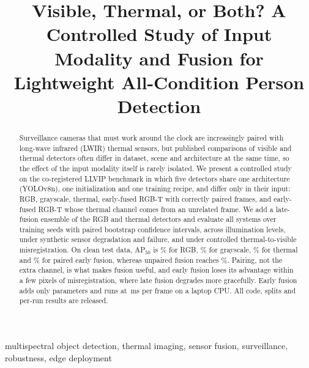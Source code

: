 \documentclass[conference]{IEEEtran}
\newif\ifpending \pendingtrue
\newcommand{\pending}[1]{\ifpending{\color{orange!85!black}#1}\else#1\fi}
\begin{document}
\title{Visible, Thermal, or Both? A Controlled Study of Input Modality and Fusion for Lightweight All-Condition Person Detection}

\author{
}

\maketitle

\begin{abstract}
Surveillance cameras that must work around the clock are increasingly paired with long-wave infrared (LWIR) thermal sensors, but published comparisons of visible and thermal detectors often differ in dataset, scene and architecture at the same time, so the effect of the input modality itself is rarely isolated. We present a controlled study on the co-registered LLVIP benchmark in which five detectors share one architecture (YOLOv8n), one initialization and one training recipe, and differ only in their input: RGB, grayscale, thermal, early-fused RGB-T with correctly paired frames, and early-fused RGB-T whose thermal channel comes from an unrelated frame. We add a late-fusion ensemble of the RGB and thermal detectors and evaluate all systems over \NSeeds{} training seeds with paired bootstrap confidence intervals, across illumination levels, under synthetic sensor degradation and failure, and under controlled thermal-to-visible misregistration. On clean test data, AP$_{50}$ is \RRgbCleanApFifty\% for RGB, \RGrayCleanApFifty\% for grayscale, \RIrCleanApFifty\% for thermal and \RRgbtCleanApFifty\% for paired early fusion, whereas unpaired fusion reaches \RRgbtUnpairedCleanApFifty\%. \pending{Pairing, not the extra channel, is what makes fusion useful, and early fusion loses its advantage within a few pixels of misregistration, where late fusion degrades more gracefully.} Early fusion adds only \FusExtraParams{} parameters and runs at \FusMs{}\,ms per frame on a laptop CPU. All code, splits and per-run results are released.
\end{abstract}

\begin{IEEEkeywords}
multispectral object detection, thermal imaging, sensor fusion, surveillance, robustness, edge deployment
\end{IEEEkeywords}
\end{document}
